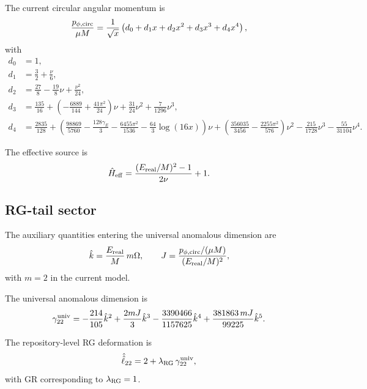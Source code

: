 \documentclass[11pt]{article}
\begin{document}
The current circular angular momentum is
\begin{equation}
  \frac{p_{\phi,{\rm circ}}}{\mu M}
  =
  \frac{1}{\sqrt{x}}
  \left(
    d_0 + d_1 x + d_2 x^2 + d_3 x^3 + d_4 x^4
  \right),
\end{equation}
with
\begin{align}
  d_0 &= 1, \\
  d_1 &= \frac{3}{2} + \frac{\nu}{6}, \\
  d_2 &= \frac{27}{8} - \frac{19}{8}\nu + \frac{\nu^2}{24}, \\
  d_3 &=
  \frac{135}{16}
  + \left(
      -\frac{6889}{144} + \frac{41\pi^2}{24}
    \right)\nu
  + \frac{31}{24}\nu^2
  + \frac{7}{1296}\nu^3, \\
  d_4 &=
  \frac{2835}{128}
  + \left(
      \frac{98869}{5760}
      - \frac{128\gamma_E}{3}
      - \frac{6455\pi^2}{1536}
      - \frac{64}{3}\log(16x)
    \right)\nu
  + \left(
      \frac{356035}{3456}
      - \frac{2255\pi^2}{576}
    \right)\nu^2
  - \frac{215}{1728}\nu^3
  - \frac{55}{31104}\nu^4.
\end{align}

The effective source is
\begin{equation}
  \hat H_{\rm eff}
  =
  \frac{(E_{\rm real}/M)^2 - 1}{2\nu} + 1.
\end{equation}

\subsection{RG-tail sector}

The auxiliary quantities entering the universal anomalous dimension are
\begin{equation}
  \hat k = \frac{E_{\rm real}}{M}\,m\Omega,
  \qquad
  J = \frac{p_{\phi,{\rm circ}}/(\mu M)}{(E_{\rm real}/M)^2},
\end{equation}
with \(m=2\) in the current model.

The universal anomalous dimension is
\begin{equation}
  \gamma^{\rm univ}_{22}
  =
  -\frac{214}{105}\hat k^2
  + \frac{2mJ}{3}\hat k^3
  - \frac{3390466}{1157625}\hat k^4
  + \frac{381863\,mJ}{99225}\hat k^5.
\end{equation}

The repository-level RG deformation is
\begin{equation}
  \hat{\hat \ell}_{22}
  =
  2 + \lambda_{\rm RG}\,\gamma^{\rm univ}_{22},
\end{equation}
with GR corresponding to \(\lambda_{\rm RG}=1\).
\end{document}
